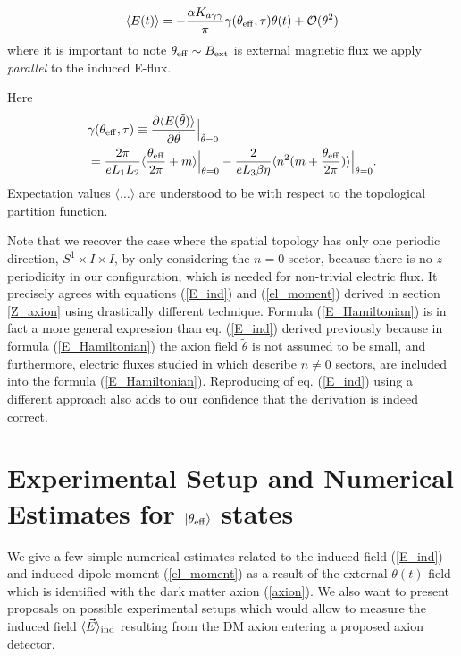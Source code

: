 \documentclass[ twocolumn,aps,prd,   
               preprintnumbers,numbers,sort&compress,nofootinbib,
                            showpacs,superscriptaddress,
               colorlinks,
               linkcolor=blue,   
               citecolor=blue]{revtex4-1}   \newcommand{\exclude}[1]{}
\def\la{\langle}
\def\ra{\rangle}
\begin{document}
\begin{equation}
 \langle E(t)\rangle =  -\frac{\alpha K_{a\gamma\gamma}}{\pi}\gamma (\theta_{\rm{eff}},\tau) \theta(t)+\mathcal{O}(\theta^2)
\end{equation}
where it is important to note $\theta_{\rm{eff}}\sim B_{\rm{ext}}$ is external magnetic flux we apply \textit{parallel} to the induced E-flux. %

Here 
\begin{align}
&\gamma(\theta_{\rm{eff}},\tau)\equiv\frac{\partial \langle E(\tilde{\theta})\rangle}{\partial \tilde{\theta}}\Big|_{\tilde{\theta}=0} \\
&= \frac{2\pi}{eL_1L_2} \langle \frac{\theta_{\rm{eff}}}{2\pi}+m\rangle\Big|_{\tilde{\theta}=0} -\frac{2}{e L_3\beta \eta }\langle  n^2 (m+\frac{\theta_{\rm{eff}}}{2\pi})\rangle\Big|_{\tilde{\theta}=0} . \nonumber
\end{align}
Expectation values $\langle \dots \rangle$ are understood to be with respect to the topological partition function.

Note that we recover the case where the spatial topology has only one periodic direction, $S^1\times I\times I$, by only considering the $n=0$ sector, because there is no $z$-periodicity in our configuration, which is needed for non-trivial electric flux. It precisely agrees with equations (\ref{E_ind}) and (\ref{el_moment}) derived in  section \ref{Z_axion} using drastically different technique. Formula (\ref{E_Hamiltonian}) is in fact a more general expression  than  eq. (\ref{E_ind}) derived previously because  in formula (\ref{E_Hamiltonian}) the axion field $\tilde{\theta}$ is not assumed to be small, and furthermore, electric fluxes studied in  \cite{Cao:2015uza} which describe  $n\neq 0$  sectors, are included into the formula  (\ref{E_Hamiltonian}). Reproducing of eq. (\ref{E_ind}) using a different approach also adds to our confidence that the derivation is indeed correct.  

 
 
 
 \section{Experimental Setup and Numerical Estimates for $|\theta_{\rm eff}\ra$ states}\label{numerics}
We give a  few simple numerical estimates related to the induced field   (\ref{E_ind}) and induced dipole moment (\ref{el_moment}) as a result of the external $\theta(t)$ field which is identified with the dark matter axion  (\ref{axion}).   We also want to present proposals on possible experimental setups which would allow to measure the induced field $\la \vec{E}\ra_{\rm ind}$ resulting from the DM axion entering a proposed axion detector.  
\end{document}
